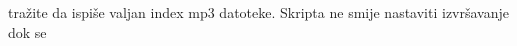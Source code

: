 \documentclass{exam}
\begin{document}
\begin{itemize}
                                                                                                                                                                                                tražite
                                                                                                                                                                                                da
                                                                                                                                                                                                ispiše
                                                                                                                                                                                                valjan
                                                                                                                                                                                                index
                                                                                                                                                                                                mp3
                                                                                                                                                                                                datoteke.
                                                                                                                                                                                                Skripta
                                                                                                                                                                                                ne
                                                                                                                                                                                                smije
                                                                                                                                                                                                nastaviti
                                                                                                                                                                                                izvršavanje
                                                                                                                                                                                                dok
                                                                                                                                                                                                se

\end{itemize}
\end{document}
